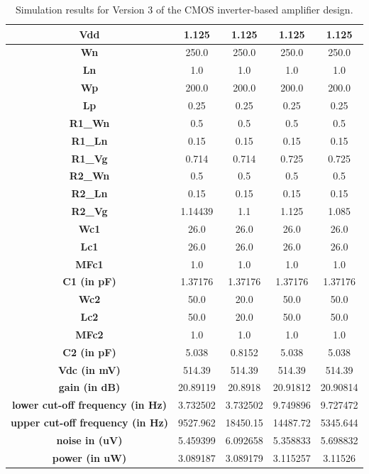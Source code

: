 \begin{table}[!ht]
    \centering 
    \begin{adjustbox}{max width=\linewidth}
    \begin{tabular}{|c|c|c|c|c|}
    \hline
        \textbf{Vdd} & 1.125 & 1.125 & 1.125 & 1.125 \\ \hline
        \textbf{Wn} & 250.0 & 250.0 & 250.0 & 250.0 \\ \hline
        \textbf{Ln} & 1.0 & 1.0 & 1.0 & 1.0 \\ \hline
        \textbf{Wp} & 200.0 & 200.0 & 200.0 & 200.0 \\ \hline
        \textbf{Lp} & 0.25 & 0.25 & 0.25 & 0.25 \\ \hline
        \textbf{R1\_Wn} & 0.5 & 0.5 & 0.5 & 0.5 \\ \hline
        \textbf{R1\_Ln} & 0.15 & 0.15 & 0.15 & 0.15 \\ \hline
        \textbf{R1\_Vg} & 0.714 & 0.714 & 0.725 & 0.725 \\ \hline
        \textbf{R2\_Wn} & 0.5 & 0.5 & 0.5 & 0.5 \\ \hline
        \textbf{R2\_Ln} & 0.15 & 0.15 & 0.15 & 0.15 \\ \hline
        \textbf{R2\_Vg} & 1.14439 & 1.1 & 1.125 & 1.085 \\ \hline
        \textbf{Wc1} & 26.0 & 26.0 & 26.0 & 26.0 \\ \hline
        \textbf{Lc1} & 26.0 & 26.0 & 26.0 & 26.0 \\ \hline
        \textbf{MFc1} & 1.0 & 1.0 & 1.0 & 1.0 \\ \hline
        \textbf{C1 (in pF)} & 1.37176 & 1.37176 & 1.37176 & 1.37176 \\ \hline
        \textbf{Wc2} & 50.0 & 20.0 & 50.0 & 50.0 \\ \hline
        \textbf{Lc2} & 50.0 & 20.0 & 50.0 & 50.0 \\ \hline
        \textbf{MFc2} & 1.0 & 1.0 & 1.0 & 1.0 \\ \hline
        \textbf{C2 (in pF)} & 5.038 & 0.8152 & 5.038 & 5.038 \\ \hline
        \textbf{Vdc (in mV)} & 514.39 & 514.39 & 514.39 & 514.39 \\ \hline
        \textbf{gain (in dB)} & 20.89119 & 20.8918 & 20.91812 & 20.90814 \\ \hline
        \textbf{lower cut-off frequency (in Hz)} & 3.732502 & 3.732502 & 9.749896 & 9.727472 \\ \hline
        \textbf{upper cut-off frequency (in Hz)} & 9527.962 & 18450.15 & 14487.72 & 5345.644 \\ \hline
        \textbf{noise in (uV)} & 5.459399 & 6.092658 & 5.358833 & 5.698832 \\ \hline
        \textbf{power (in uW)} & 3.089187 & 3.089179 & 3.115257 & 3.11526 \\ \hline
    \end{tabular}
    \end{adjustbox}
    \caption{Simulation results for Version 3 of the CMOS inverter-based amplifier design.}
    \label{tab:v3_sim_results}
\end{table}

